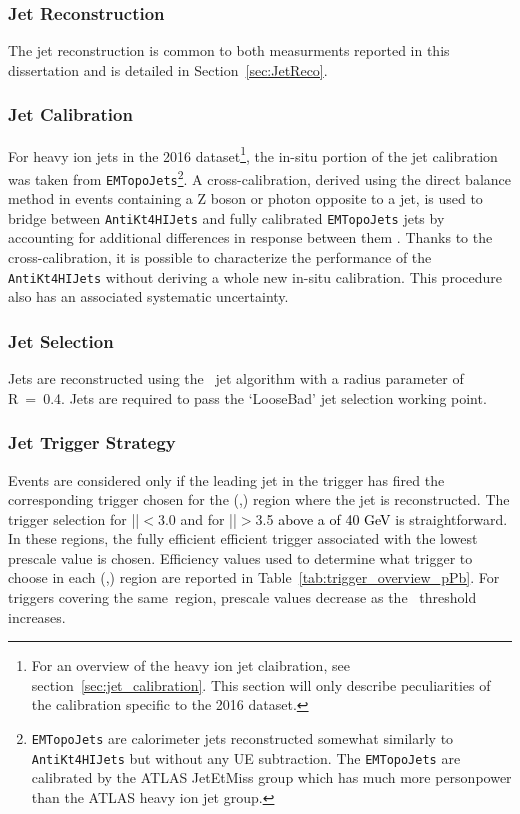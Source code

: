 \subsubsection{Jet Reconstruction}
The jet reconstruction is common to both measurments reported in this dissertation and is detailed in Section~\ref{sec:JetReco}.
\subsubsection{Jet Calibration}
For heavy ion jets in the 2016 dataset\footnote{For an overview of the heavy ion jet claibration, see section~\ref{sec:jet_calibration}.  This section will only describe peculiarities of the calibration specific to the 2016 dataset.}, the in-situ portion of the jet calibration was taken from \texttt{EMTopoJets}\footnote{\texttt{EMTopoJets} are calorimeter jets reconstructed somewhat similarly to \texttt{AntiKt4HIJets} but without any UE subtraction.  The \texttt{EMTopoJets} are calibrated by the ATLAS JetEtMiss group which has much more personpower than the ATLAS heavy ion jet group.}. A cross-calibration, derived using the direct balance method in events containing a Z boson or photon opposite to a jet, is used to bridge between \texttt{AntiKt4HIJets} and fully calibrated \texttt{EMTopoJets} jets by accounting for additional differences in response between them \cite{Ouellette:2655891}. Thanks to the cross-calibration, it is possible to characterize the performance of the \texttt{AntiKt4HIJets} without deriving a whole new in-situ calibration. This procedure also has an associated systematic uncertainty.
\subsubsection{Jet Selection}
Jets are reconstructed using the \antikt\ jet algorithm with a radius parameter of R~=~0.4.
Jets are required to pass the `LooseBad' jet selection working point.
\subsubsection{Jet Trigger Strategy}
Events are considered only if the leading jet in the trigger has fired the corresponding trigger chosen for the (\ETA,\PT{}) region where the jet is reconstructed.
The trigger selection for |\ETA|$<$3.0 and for |\ETA|$>$3.5
\textcolor{black}{
    above a \PT{ }of 40 GeV
}
is straightforward. In these regions, the fully efficient efficient trigger associated with the lowest prescale value is chosen. Efficiency values used to determine what trigger to choose in each (\ETA,\PT{}) region are reported in Table~\ref{tab:trigger_overview_pPb}. For triggers covering the same \ETA\,region, prescale values decrease as the \PT\ threshold increases.

